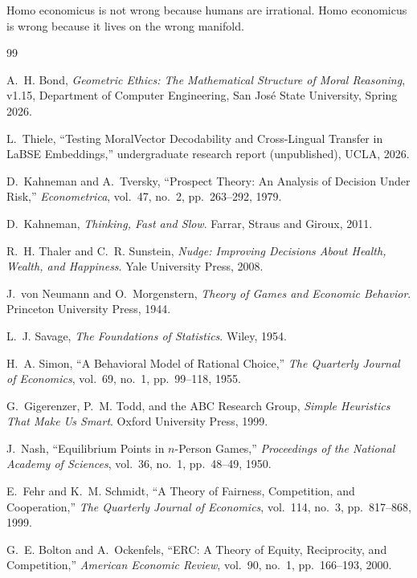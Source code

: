 \documentclass[12pt]{article}
\theoremstyle{definition}
\theoremstyle{remark}
\begin{document}
Homo economicus is not wrong because humans are irrational.  Homo economicus is wrong because it lives on the wrong manifold.


\begin{thebibliography}{99}

A.~H. Bond, \emph{Geometric Ethics: The Mathematical Structure of Moral Reasoning}, v1.15, Department of Computer Engineering, San Jos\'{e} State University, Spring 2026.

L.~Thiele, ``Testing MoralVector Decodability and Cross-Lingual Transfer in LaBSE Embeddings,'' undergraduate research report (unpublished), UCLA, 2026.

D.~Kahneman and A.~Tversky, ``Prospect Theory: An Analysis of Decision Under Risk,'' \emph{Econometrica}, vol.~47, no.~2, pp.~263--292, 1979.

D.~Kahneman, \emph{Thinking, Fast and Slow}. Farrar, Straus and Giroux, 2011.

R.~H. Thaler and C.~R. Sunstein, \emph{Nudge: Improving Decisions About Health, Wealth, and Happiness}. Yale University Press, 2008.

J.~von Neumann and O.~Morgenstern, \emph{Theory of Games and Economic Behavior}. Princeton University Press, 1944.

L.~J. Savage, \emph{The Foundations of Statistics}. Wiley, 1954.

H.~A. Simon, ``A Behavioral Model of Rational Choice,'' \emph{The Quarterly Journal of Economics}, vol.~69, no.~1, pp.~99--118, 1955.

G.~Gigerenzer, P.~M. Todd, and the ABC Research Group, \emph{Simple Heuristics That Make Us Smart}. Oxford University Press, 1999.

J.~Nash, ``Equilibrium Points in $n$-Person Games,'' \emph{Proceedings of the National Academy of Sciences}, vol.~36, no.~1, pp.~48--49, 1950.

E.~Fehr and K.~M. Schmidt, ``A Theory of Fairness, Competition, and Cooperation,'' \emph{The Quarterly Journal of Economics}, vol.~114, no.~3, pp.~817--868, 1999.

G.~E. Bolton and A.~Ockenfels, ``ERC: A Theory of Equity, Reciprocity, and Competition,'' \emph{American Economic Review}, vol.~90, no.~1, pp.~166--193, 2000.


\end{thebibliography}
\end{document}
